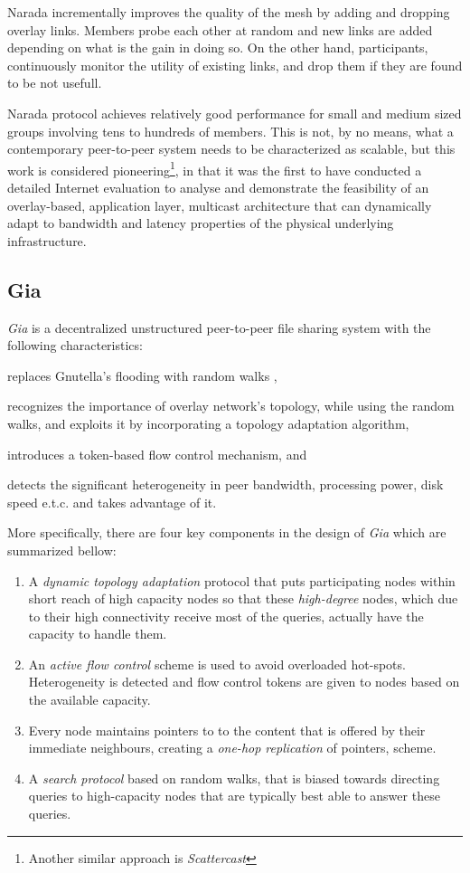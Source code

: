 \documentclass[a4paper,10pt]{article}
\begin{document}
Narada incrementally improves the quality of the mesh by adding and dropping overlay links. Members probe each other at random and new links are added depending on what is the gain in doing so. On the other hand, participants, continuously  monitor the utility of existing links, and drop them if they are found to be not usefull.

Narada protocol achieves relatively good performance for small and medium sized groups involving tens to hundreds of members. This is not, by no means, what a contemporary peer-to-peer system needs to be characterized as scalable, but this work is considered pioneering\footnote{Another similar approach is \emph{Scattercast}\cite{chawathe_scattercast_2000}}, in that it was the first to have conducted a detailed Internet evaluation to analyse and demonstrate the feasibility of an overlay-based, application layer, multicast architecture that can dynamically adapt to bandwidth and latency properties of the physical underlying infrastructure.

\subsection{Gia}
\emph{Gia} \cite{chawathe_gia_2003} is a decentralized unstructured peer-to-peer file sharing system with the following characteristics:
\begin{inparaenum}
  \item replaces Gnutella's flooding with random walks \cite{lv_randomwalks_2002},
  \item recognizes the importance of overlay network's topology, while using the random walks, and exploits it by incorporating a topology adaptation algorithm,
  \item introduces a token-based flow control mechanism, and
  \item detects the significant heterogeneity in peer bandwidth, processing power, disk speed e.t.c. and takes advantage of it.
\end{inparaenum}

More specifically, there are four key components in the design of \emph{Gia} which are summarized bellow:
\begin{enumerate}
  \item A \emph{dynamic topology adaptation} protocol that puts participating nodes within short reach of high capacity nodes so that these \emph{high-degree} nodes, which due to their high connectivity receive most of the queries, actually have the capacity to handle them.
  \item An \emph{active flow control} scheme is used to avoid overloaded hot-spots. Heterogeneity is detected and flow control tokens are given to nodes based on the available capacity.
  \item Every node maintains pointers to to the content that is offered by their immediate neighbours, creating a \emph{one-hop replication} of pointers, scheme.
  \item A \emph{search protocol} based on random walks, that is biased towards directing queries to high-capacity nodes that are typically best able to answer these queries.
\end{enumerate}
\end{document}
